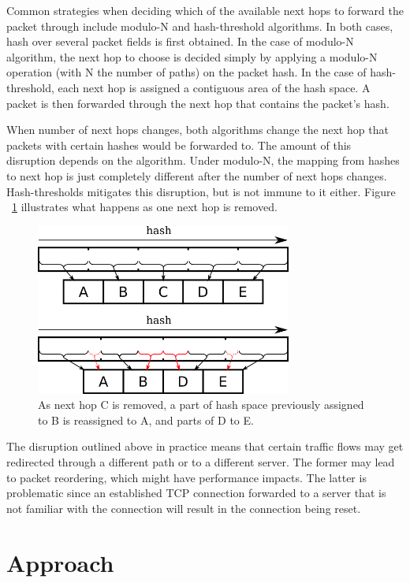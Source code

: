 \documentclass[letterpaper]{article}
\begin{document}
Common strategies when deciding which of the available next hops to forward
the packet through include modulo-N and hash-threshold
algorithms\protect\cite{rfc2992}. In both cases, hash over several packet
fields is first obtained. In the case of modulo-N algorithm, the next hop
to choose is decided simply by applying a modulo-N operation (with N the
number of paths) on the packet hash. In the case of hash-threshold, each
next hop is assigned a contiguous area of the hash space. A packet is then
forwarded through the next hop that contains the packet's hash.

When number of next hops changes, both algorithms change the next hop that
packets with certain hashes would be forwarded to. The amount of this
disruption depends on the algorithm. Under modulo-N, the mapping from
hashes to next hop is just completely different after the number of next
hops changes. Hash-thresholds mitigates this disruption, but is not immune
to it either. Figure ~\ref{fig:hash-threshold-disruption} illustrates what
happens as one next hop is removed.

\begin{figure}[H]
\includegraphics[width=3.31in]{hash-threshold-disruption.png}
\caption{As next hop C is removed, a part of hash space previously assigned
  to B is reassigned to A, and parts of D to E.}
\label{fig:hash-threshold-disruption}
\end{figure}

The disruption outlined above in practice means that certain traffic flows
may get redirected through a different path or to a different server. The
former may lead to packet reordering, which might have performance impacts.
The latter is problematic since an established TCP connection forwarded to
a server that is not familiar with the connection will result in the
connection being reset.

\section{Approach}
\end{document}
